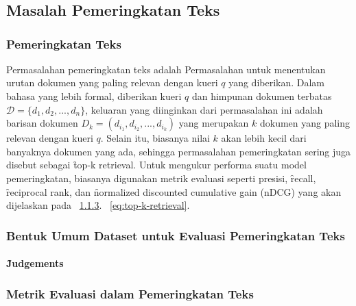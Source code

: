\chapter{\babDua}
\label{bab:2}

\noindent{}



\section{Masalah Pemeringkatan Teks}
    \subsection{Pemeringkatan Teks}

    Permasalahan pemeringkatan teks adalah Permasalahan untuk menentukan urutan dokumen yang paling relevan dengan kueri $q$ yang diberikan. Dalam bahasa yang lebih formal, diberikan kueri $q$ dan himpunan dokumen terbatas $\mathcal{D}= \{d_1, d_2, ..., d_n\}$, keluaran yang diinginkan dari permasalahan ini adalah barisan dokumen $D_k = (d_{i_1}, d_{i_2}, ..., d_{i_k})$ yang merupakan $k$ dokumen yang paling relevan dengan kueri $q$. Selain itu, biasanya nilai $k$ akan lebih kecil dari banyaknya dokumen yang ada, sehingga permasalahan pemeringkatan sering juga disebut sebagai \f{top-k retrieval}. Untuk mengukur performa suatu model pemeringkatan, biasanya digunakan metrik evaluasi seperti presisi, \f{recall}, \f{reciprocal rank}, dan \f{normalized discounted cumulative gain} (nDCG) yang akan dijelaskan pada \sect~\ref{sec:metrik-evaluasi}. \equ~\ref{eq:top-k-retrieval}.

    \subsection{Bentuk Umum Dataset untuk Evaluasi Pemeringkatan Teks}
    \label{sec:dataset-umum}
    


        \subsubsection{\f{Judgements}}
    

    \subsection{Metrik Evaluasi dalam Pemeringkatan Teks}
    \label{sec:metrik-evaluasi}

